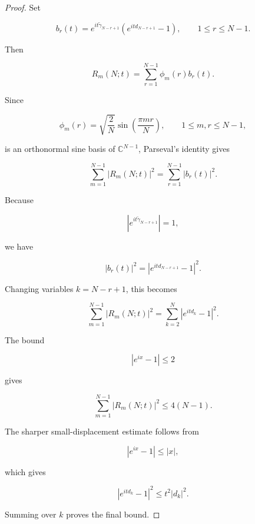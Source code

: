 \documentclass[11pt]{amsart}
\numberwithin{equation}{section}
\theoremstyle{plain}
\theoremstyle{definition}
\theoremstyle{remark}
\begin{document}
\begin{proof}
Set

\begin{equation}
b_r(t)
=
e^{it\widetilde\gamma_{N-r+1}}
\left(
e^{itd_{N-r+1}}-1
\right),
\qquad
1\le r\le N-1.
\end{equation}

Then

\begin{equation}
R_m(N;t)
=
\sum_{r=1}^{N-1}\phi_m(r)b_r(t).
\end{equation}

Since

\begin{equation}
\phi_m(r)
=
\sqrt{\frac2N}
\sin\left(\frac{\pi mr}{N}\right),
\qquad
1\le m,r\le N-1,
\end{equation}

is an orthonormal sine basis of \(\mathbb C^{N-1}\), Parseval's identity
gives

\begin{equation}
\sum_{m=1}^{N-1}|R_m(N;t)|^2
=
\sum_{r=1}^{N-1}|b_r(t)|^2.
\end{equation}

Because

\begin{equation}
|e^{it\widetilde\gamma_{N-r+1}}|=1,
\end{equation}

we have

\begin{equation}
|b_r(t)|^2
=
\left|
e^{itd_{N-r+1}}-1
\right|^2.
\end{equation}

Changing variables \(k=N-r+1\), this becomes

\begin{equation}
\sum_{m=1}^{N-1}|R_m(N;t)|^2
=
\sum_{k=2}^{N}|e^{itd_k}-1|^2.
\end{equation}

The bound

\begin{equation}
|e^{ix}-1|\le2
\end{equation}

gives

\begin{equation}
\sum_{m=1}^{N-1}|R_m(N;t)|^2
\le
4(N-1).
\end{equation}

The sharper small-displacement estimate follows from

\begin{equation}
|e^{ix}-1|\le |x|,
\end{equation}

which gives

\begin{equation}
|e^{itd_k}-1|^2
\le
t^2|d_k|^2.
\end{equation}

Summing over \(k\) proves the final bound.
\end{proof}
\end{document}
